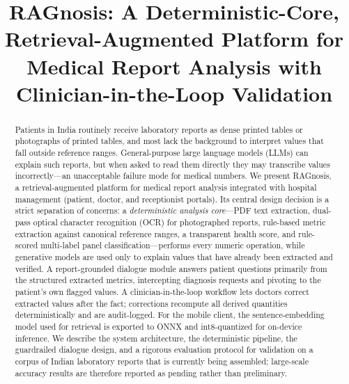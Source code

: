 \documentclass[conference]{IEEEtran}
\begin{document}
\title{RAGnosis: A Deterministic-Core, Retrieval-Augmented Platform for
Medical Report Analysis with Clinician-in-the-Loop Validation}

\author{
\and
{}
}

\maketitle

\begin{abstract}
Patients in India routinely receive laboratory reports as dense printed
tables or photographs of printed tables, and most lack the background to
interpret values that fall outside reference ranges. General-purpose
large language models (LLMs) can explain such reports, but when asked to
read them directly they may transcribe values incorrectly---an
unacceptable failure mode for medical numbers. We present RAGnosis, a
retrieval-augmented platform for medical report analysis integrated with
hospital management (patient, doctor, and receptionist portals). Its
central design decision is a strict separation of concerns: a
\emph{deterministic analysis core}---PDF text extraction, dual-pass
optical character recognition (OCR) for photographed reports, rule-based
metric extraction against canonical reference ranges, a transparent
health score, and rule-scored multi-label panel classification---performs
every numeric operation, while generative models are used only to
explain values that have already been extracted and verified. A
report-grounded dialogue module answers patient questions primarily from
the structured extracted metrics, intercepting diagnosis requests and
pivoting to the patient's own flagged values. A clinician-in-the-loop
workflow lets doctors correct extracted values after the fact; corrections
recompute all derived quantities deterministically and are audit-logged.
For the mobile client, the sentence-embedding model used for retrieval
is exported to ONNX and int8-quantized for on-device inference. We
describe the system architecture, the deterministic pipeline, the
guardrailed dialogue design, and a rigorous evaluation protocol for
validation on a corpus of Indian laboratory reports that is currently
being assembled; large-scale accuracy results are therefore reported as
pending rather than preliminary.
\end{abstract}
\end{document}
